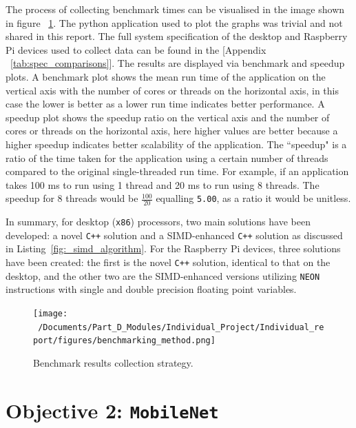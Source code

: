 The process of collecting benchmark times can be visualised in the image shown in figure ~\ref{fig:results_collection}. The python application used to plot the graphs was trivial and not shared in this report. The full system specification of the desktop and Raspberry Pi devices used to collect data can be found in the [Appendix ~\ref{tab:spec_comparisons}]. The results are displayed via benchmark and speedup plots. A benchmark plot shows the mean run time of the application on the vertical axis with the number of cores or threads on the horizontal axis, in this case the lower is better as a lower run time indicates better performance. A speedup plot shows the speedup ratio on the vertical axis and the number of cores or threads on the horizontal axis, here higher values are better because a higher speedup indicates better scalability of the application. The ``speedup" is a ratio of the time taken for the application using a certain number of threads compared to the original single-threaded run time. For example, if an application takes 100 ms to run using 1 thread and 20 ms to run using 8 threads. The speedup for 8 threads would be $\frac{100}{20}$ equalling \texttt{5.00}, as a ratio it would be unitless. 

In summary, for desktop (\texttt{x86}) processors, two main solutions have been developed: a novel \texttt{C++} solution and a SIMD-enhanced \texttt{C++} solution as discussed in Listing~\ref{fig:_simd_algorithm}. For the Raspberry Pi devices, three solutions have been created: the first is the novel \texttt{C++} solution, identical to that on the desktop, and the other two are the SIMD-enhanced versions utilizing \texttt{NEON} instructions with single and double precision floating point variables.

\begin{figure}[htbp] %
	\centering
	\texttt{[image: ~/Documents/Part\_D\_Modules/Individual\_Project/Individual\_report/figures/benchmarking\_method.png]} %
	\caption{Benchmark results collection strategy.}
	\label{fig:results_collection} %
\end{figure}

\section{Objective 2: \texttt{MobileNet}}

